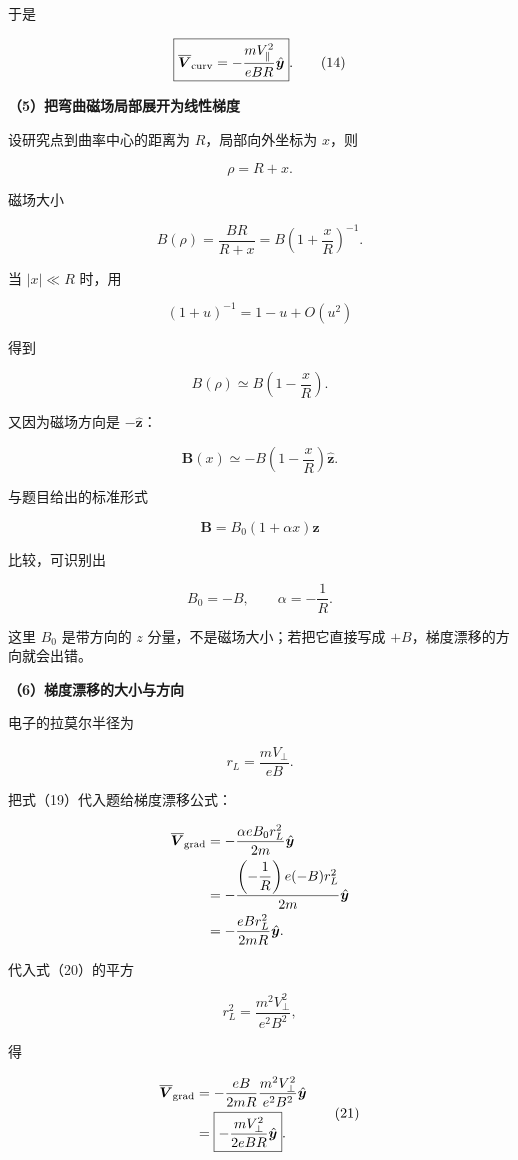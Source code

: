 \documentclass[12pt,a4paper,UTF8]{ctexart}
\begin{document}
于是

\[
\boxed{
\overline{\boldsymbol V}_{\rm curv}
=-\frac{mV_{\parallel}^2}{eBR}
\hat{\boldsymbol y}
}.
\tag{14}
\]

\textbf{（5）把弯曲磁场局部展开为线性梯度}

设研究点到曲率中心的距离为 \(R\)，局部向外坐标为 \(x\)，则

\[
\rho=R+x.
\tag{15}
\]

磁场大小

\[
B(\rho)=\frac{BR}{R+x}
=B\left(1+\frac xR\right)^{-1}.
\tag{16}
\]

当 \(|x|\ll R\) 时，用

\[
(1+u)^{-1}=1-u+O(u^2)
\]

得到

\[
B(\rho)
\simeq B\left(1-\frac xR\right).
\tag{17}
\]

又因为磁场方向是 \(-\hat{\boldsymbol z}\)：

\[
\boldsymbol B(x)
\simeq -B\left(1-\frac xR\right)
\hat{\boldsymbol z}.
\tag{18}
\]

与题目给出的标准形式

\[
\boldsymbol B=B_0(1+\alpha x)\hat{\boldsymbol z}
\]

比较，可识别出

\[
B_0=-B,
\qquad
\alpha=-\frac1R.
\tag{19}
\]

这里 \(B_0\) 是带方向的 \(z\) 分量，不是磁场大小；若把它直接写成
\(+B\)，梯度漂移的方向就会出错。

\textbf{（6）梯度漂移的大小与方向}

电子的拉莫尔半径为

\[
r_L=\frac{mV_\perp}{eB}.
\tag{20}
\]

把式（19）代入题给梯度漂移公式：

\[
\begin{aligned}
\overline{\boldsymbol V}_{\rm grad}
&=-\frac{\alpha eB_0r_L^2}{2m}
\hat{\boldsymbol y}\\
&=-\frac{
\left(-\dfrac1R\right)e(-B)r_L^2
}{2m}\hat{\boldsymbol y}\\
&=-\frac{eBr_L^2}{2mR}
\hat{\boldsymbol y}.
\end{aligned}
\]

代入式（20）的平方

\[
r_L^2=\frac{m^2V_\perp^2}{e^2B^2},
\]

得

\[
\begin{aligned}
\overline{\boldsymbol V}_{\rm grad}
&=-\frac{eB}{2mR}
\frac{m^2V_\perp^2}{e^2B^2}
\hat{\boldsymbol y}\\
&=\boxed{
-\frac{mV_\perp^2}{2eBR}
\hat{\boldsymbol y}
}.
\end{aligned}
\tag{21}
\]
\end{document}
